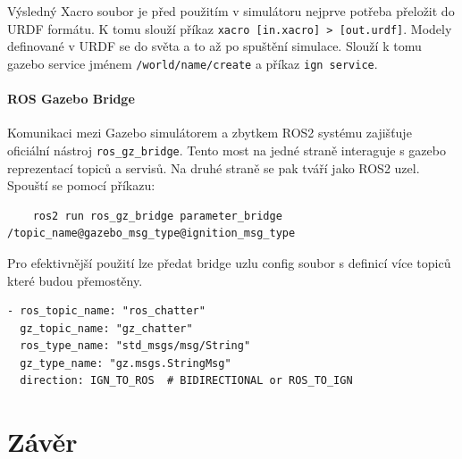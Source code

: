 Výsledný Xacro soubor je před použitím v simulátoru nejprve potřeba přeložit do URDF formátu. K tomu slouží příkaz \verb|xacro [in.xacro] > [out.urdf]|. Modely definované v URDF se do světa  a to až po spuštění simulace. Slouží k tomu gazebo service jménem \verb|/world/name/create| a příkaz \verb|ign service|. 

\subsubsection*{ROS Gazebo Bridge}
Komunikaci mezi Gazebo simulátorem a zbytkem ROS2 systému zajišťuje oficiální nástroj \verb|ros_gz_bridge|. Tento most na jedné straně interaguje s gazebo reprezentací topiců a servisů. Na druhé straně se pak tváří jako ROS2 uzel. Spouští se pomocí příkazu:
\begin{verbatim}
	ros2 run ros_gz_bridge parameter_bridge /topic_name@gazebo_msg_type@ignition_msg_type
\end{verbatim}
Pro efektivnější použití lze předat bridge uzlu config soubor s definicí více topiců které budou přemostěny.
\begin{verbatim}
- ros_topic_name: "ros_chatter"
  gz_topic_name: "gz_chatter"
  ros_type_name: "std_msgs/msg/String"
  gz_type_name: "gz.msgs.StringMsg"
  direction: IGN_TO_ROS  # BIDIRECTIONAL or ROS_TO_IGN
\end{verbatim}

\chapter{Závěr}


%
